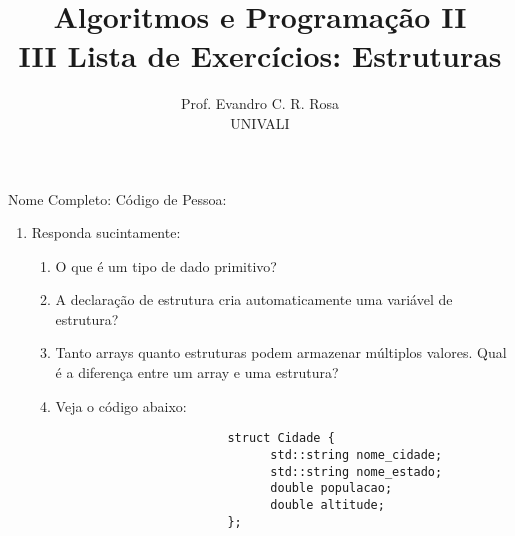 \documentclass[12pt]{article}
\title{Algoritmos e Programação II\\
\large III Lista de Exercícios: Estruturas}
\author{Prof. Evandro C. R. Rosa\\UNIVALI}
\date{}
\begin{document}
\maketitle

\noindent Nome Completo: \underline{\hspace{8cm}} Código de Pessoa: \underline{\hspace{2.4cm}}

\begin{enumerate}
      \item Responda sucintamente:
            \begin{enumerate}
                  \item O que é um tipo de dado primitivo?
                  \item A declaração de estrutura cria automaticamente uma variável de estrutura?
                  \item Tanto arrays quanto estruturas podem armazenar múltiplos valores. Qual é a diferença entre um array e uma estrutura?
                  \item Veja o código abaixo:
                        \begin{verbatim}
                        struct Cidade {  
                              std::string nome_cidade; 
                              std::string nome_estado; 
                              double populacao; 
                              double altitude; 
                        };
                  

\end{verbatim}
\end{enumerate}
\end{enumerate}
\end{document}
